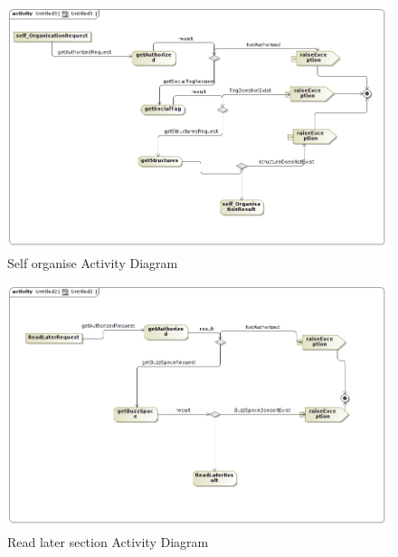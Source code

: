 \documentclass[11pt]{article}
\begin{document}
	\begin{figure}[H]	
\graphicspath{ {../Diagrams/sfiso/} }
    	\includegraphics[scale=0.5]{selfA.jpg}
    	\caption{Self organise Activity Diagram}
	\end{figure}

	\begin{figure}[H]	
\graphicspath{ {../Diagrams/sfiso/} }
    	\includegraphics[scale=0.5]{readA.jpg}
    	\caption{Read later section Activity Diagram}
	\end{figure}
\end{document}
